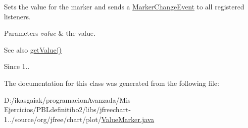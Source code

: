 Sets the value for the marker and sends a \mbox{\hyperlink{}{Marker\+Change\+Event}} to all registered listeners.


\begin{DoxyParams}{Parameters}
{\em value} & the value.\\
\hline
\end{DoxyParams}
\begin{DoxySeeAlso}{See also}
\mbox{\hyperlink{classorg_1_1jfree_1_1chart_1_1plot_1_1_value_marker_a35a29a86d49dfc6421c05bd3e2ea338a}{get\+Value()}}
\end{DoxySeeAlso}
\begin{DoxySince}{Since}
1.. 
\end{DoxySince}


The documentation for this class was generated from the following file\+:\begin{DoxyCompactItemize}
\item 
D\+:/ikasgaiak/programacion\+Avanzada/\+Mis Ejercicios/\+P\+B\+Ldefinitibo2/libs/jfreechart-\/1../source/org/jfree/chart/plot/\mbox{\hyperlink{_value_marker_8java}{Value\+Marker.\+java}}\end{DoxyCompactItemize}
